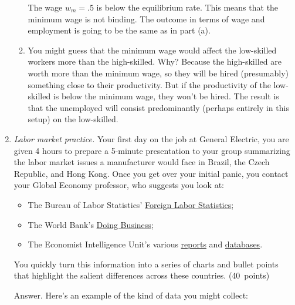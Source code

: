 \documentclass[letterpaper,12pt]{article}
\begin{document}
\begin{enumerate}
\begin{enumerate}

The wage $w_{m}=.5$ is below the equilibrium rate. This means that
the minimum wage is not binding. The outcome in terms of wage and
employment is going to be the same as in part (a).

\item You might guess that the minimum wage would  affect 
the low-skilled workers more than the high-skilled. 
Why?  Because the high-skilled are worth more than the minimum 
wage, so they will be hired (presumably) something close to their 
productivity.
But if the productivity of the low-skilled is below the minimum wage, 
they won't be hired. 
The result is that the unemployed will consist predominantly 
(perhaps entirely in this setup) 
on the low-skilled. 

\end{enumerate}


\item {\it Labor market practice.\/}  
Your first day on the job at General Electric, 
you are given 4 hours to prepare
a 5-minute presentation to your group summarizing the 
labor market issues a manufacturer would face in 
Brazil, the Czech Republic, and Hong Kong.    
Once you get over your initial panic, you contact your Global Economy 
professor, who suggests you look at:    
%
\begin{itemize}

\item The Bureau of Labor Statistics'
\href{http://www.bls.gov/fls/}{Foreign Labor Statistics};


\item The World Bank's
\href{http://www.doingbusiness.org/}
{Doing Business};   

\item The Economist Intelligence Unit's various 
\href{http://db.eiu.com/topic_view.asp?pubcode=CP&title=Country+Profile}{reports} 
and 
\href{http://www.countrydata.bvdep.com/cgi/template.dll?product=101&user=ipaddress}
{databases}.  

\end{itemize}
%
You quickly turn this information into a series of charts and bullet points 
that highlight the salient differences across these countries.  (40~points) 

Answer.  Here's an example of the kind of data you
might collect:  


\end{enumerate}
\end{document}
